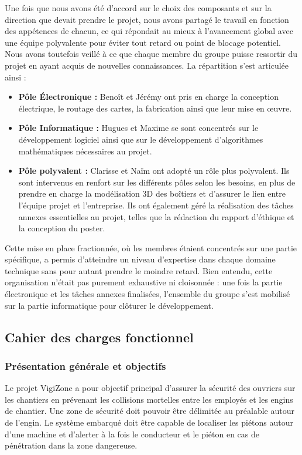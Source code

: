 Une fois que nous avons été d'accord sur le choix des composants et sur la direction que devait prendre le projet, nous avons partagé le travail en fonction des appétences de chacun, ce qui répondait au mieux à l'avancement global avec une équipe polyvalente pour éviter tout retard ou point de blocage potentiel. Nous avons toutefois veillé à ce que chaque membre du groupe puisse ressortir du projet en ayant acquis de nouvelles connaissances. La répartition s'est articulée ainsi :

\begin{itemize}
\item \textbf{Pôle Électronique :} Benoît et Jérémy ont pris en charge la conception électrique, le routage des cartes, la fabrication ainsi que leur mise en œuvre.
\item \textbf{Pôle Informatique :} Hugues et Maxime se sont concentrés sur le développement logiciel ainsi que sur le développement d'algorithmes mathématiques nécessaires au projet.
\item \textbf{Pôle polyvalent :} Clarisse et Naïm ont adopté un rôle plus polyvalent. Ils sont intervenus en renfort sur les différents pôles selon les besoins, en plus de prendre en charge la modélisation 3D des boîtiers et d'assurer le lien entre l'équipe projet et l'entreprise. Ils ont également géré la réalisation des tâches annexes essentielles au projet, telles que la rédaction du rapport d'éthique et la conception du poster.
\end{itemize}

Cette mise en place fractionnée, où les membres étaient concentrés sur une partie spécifique, a permis d'atteindre un niveau d'expertise dans chaque domaine technique sans pour autant prendre le moindre retard. Bien entendu, cette organisation n'était pas purement exhaustive ni cloisonnée : une fois la partie électronique et les tâches annexes finalisées, l'ensemble du groupe s'est mobilisé sur la partie informatique pour clôturer le développement.


\subsection{Cahier des charges fonctionnel}

\subsubsection{Présentation générale et objectifs}
Le projet VigiZone a pour objectif principal d'assurer la sécurité des ouvriers sur les chantiers en prévenant les collisions mortelles entre les employés et les engins de chantier.
Une zone de sécurité doit pouvoir être délimitée au préalable autour de l’engin.
Le système embarqué doit être capable de localiser les piétons autour d'une machine et d'alerter à la fois le conducteur et le piéton en cas de pénétration dans la zone dangereuse.

